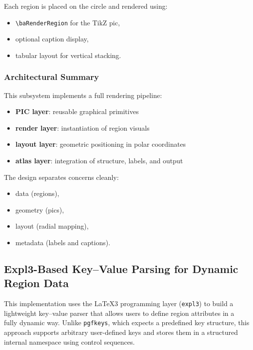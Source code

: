 Each region is placed on the circle and rendered using:

\begin{itemize}
\item \lstinline|\baRenderRegion| for the TikZ pic,
\item optional caption display,
\item tabular layout for vertical stacking.
\end{itemize}



\subsubsection{Architectural Summary}

This subsystem implements a full rendering pipeline:

\begin{itemize}
\item \textbf{PIC layer}: reusable graphical primitives
\item \textbf{render layer}: instantiation of region visuals
\item \textbf{layout layer}: geometric positioning in polar coordinates
\item \textbf{atlas layer}: integration of structure, labels, and output
\end{itemize}

The design separates concerns cleanly:

\begin{itemize}
\item data (regions),
\item geometry (pics),
\item layout (radial mapping),
\item metadata (labels and captions).
\end{itemize}

\subsection{Expl3-Based Key–Value Parsing for Dynamic Region Data}

This implementation uses the \LaTeX3 programming layer (\texttt{expl3}) to build a lightweight key–value parser that allows users to define region attributes in a fully dynamic way. Unlike \texttt{pgfkeys}, which expects a predefined key structure, this approach supports arbitrary user-defined keys and stores them in a structured internal namespace using control sequences.

